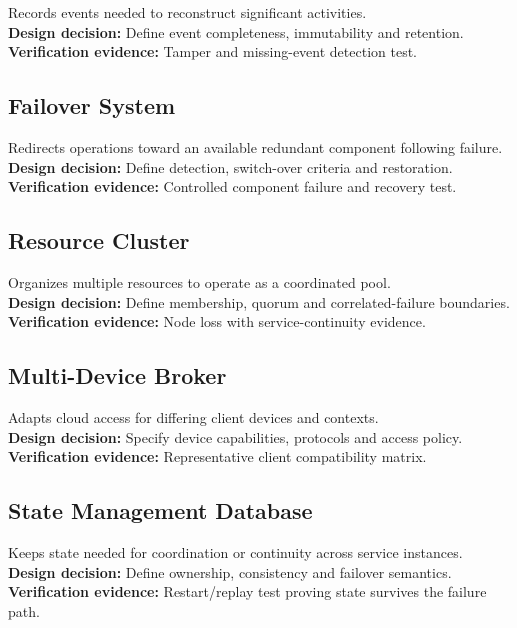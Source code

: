 \documentclass[10pt,letterpaper]{article}
\begin{document}
Records events needed to reconstruct significant activities.\\[4pt]
\textbf{Design decision:} Define event completeness, immutability and retention.\\[3pt]
\textbf{Verification evidence:} Tamper and missing-event detection test.\\[3pt]
\subsection{Failover System}
Redirects operations toward an available redundant component following failure.\\[4pt]
\textbf{Design decision:} Define detection, switch-over criteria and restoration.\\[3pt]
\textbf{Verification evidence:} Controlled component failure and recovery test.\\[3pt]
\subsection{Resource Cluster}
Organizes multiple resources to operate as a coordinated pool.\\[4pt]
\textbf{Design decision:} Define membership, quorum and correlated-failure boundaries.\\[3pt]
\textbf{Verification evidence:} Node loss with service-continuity evidence.\\[3pt]
\subsection{Multi-Device Broker}
Adapts cloud access for differing client devices and contexts.\\[4pt]
\textbf{Design decision:} Specify device capabilities, protocols and access policy.\\[3pt]
\textbf{Verification evidence:} Representative client compatibility matrix.\\[3pt]
\subsection{State Management Database}
Keeps state needed for coordination or continuity across service instances.\\[4pt]
\textbf{Design decision:} Define ownership, consistency and failover semantics.\\[3pt]
\textbf{Verification evidence:} Restart/replay test proving state survives the failure path.\\[3pt]
\end{document}
